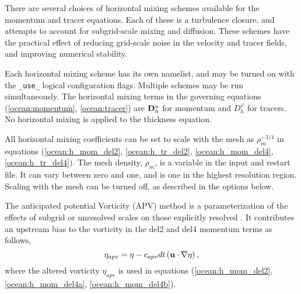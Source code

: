 There are several choices of horizontal mixing schemes available for the 
momentum and tracer equations.  Each of these is a turbulence closure, 
and attempts to account for subgrid-scale mixing and diffusion.  These 
schemes have the practical effect of reducing grid-scale noise in the 
velocity and tracer fields, and improving numerical stability.

Each horizontal mixing scheme has its own namelist, and may be turned
on with the \verb|_use_| logical configuration flags.  Multiple
schemes may be run simultaneously.  The horizontal mixing terms in the
governing equations (\ref{ocean:momentum},
\ref{ocean:tracer}) are ${\bf D}^u_h$ for momentum and
$D^\varphi_h$ for tracers.  No horizontal mixing is applied to the
thickness equation.

All horizontal mixing coefficients can be set to scale with the mesh as $\rho_m^{-3/4}$ in equations (\ref{ocean:h_mom_del2}, \ref{ocean:h_tr_del2}, \ref{ocean:h_mom_del4}, \ref{ocean:h_tr_del4}).  The mesh density, $\rho_m$, is a variable in the input and restart file.  It can vary between zero and one, and is one in the highest resolution region.  Scaling with the mesh can be turned off, as described in the options below.

The anticipated potential Vorticity (APV) method is a parameterization of the effects of subgrid or unresolved scales on those explicitly resolved \citep{Vallis_Hua88jas}.  It contributes an upstream bias to the vorticity in the del2 and del4 momentum terms as follows,
\begin{equation}
\eta_{apv} = \eta - c_{apv} dt \left({\bf u}\cdot \nabla \eta\right),
\end{equation}
where the altered vorticity $\eta_{apv}$ is used in equations (\ref{ocean:h_mom_del2}, \ref{ocean:h_mom_del4a}, \ref{ocean:h_mom_del4b}).
